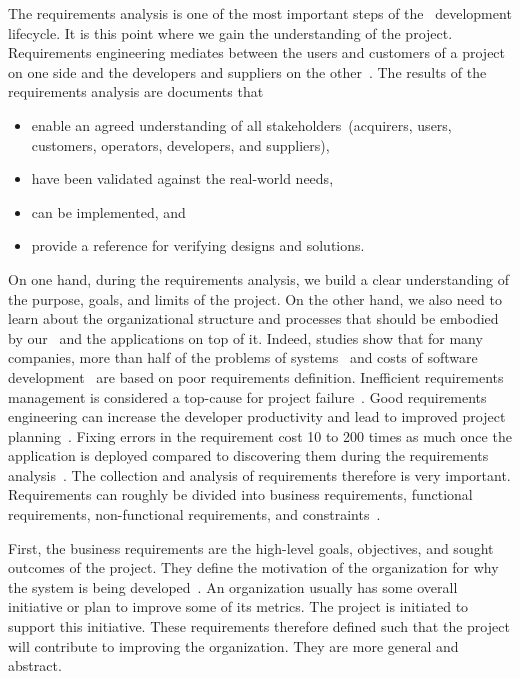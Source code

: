 %
%
The requirements analysis is one of the most important steps of the \db\ development lifecycle.
It is this point where we gain the understanding of the project.
Requirements engineering mediates between the users and customers of a project on one side and the developers and suppliers on the other~\cite{ISOIECIEEE2018SASELCPRE}.
The results of the requirements analysis are  documents that~\cite{ISOIECIEEE2018SASELCPRE}%
\begin{itemize}[noitemsep]%
\item enable an agreed understanding of all stakeholders~(acquirers, users, customers, operators, developers, and suppliers),%
\item have been validated against the real-world needs,%
\item can be implemented, and%
\item provide a reference for verifying designs and solutions.%
\end{itemize}%
%
On one hand, during the requirements analysis, we build a clear understanding of the purpose, goals, and limits of the project.
On the other hand, we also need to learn about the organizational structure and processes that should be embodied by our \db\ and the applications on top of it.
Indeed, studies show that for many companies, more than half of the problems of systems~\cite{S2003ISA6P:RDARS} and costs of software development~\cite{IC2009BAB2TPTS} are based on poor requirements definition.
Inefficient requirements management is considered a top-cause for project failure~\cite{EDN2005RUIFACI}.
Good requirements engineering can increase the developer productivity and lead to improved project planning~\cite{DCVP2005READSDFFAC}.
Fixing errors in the requirement cost 10 to 200 times as much once the application is deployed compared to discovering them during the requirements analysis~\cite{BP1988UACSC,M2001FTEAOOP,RGJ2023EASARBFSAR}.
The collection and analysis of requirements therefore is very important.%
%
Requirements can roughly be divided into business requirements, functional requirements, non-functional requirements, and constraints~\cite{I2018SAH}.

First, the business requirements are the high-level goals, objectives, and sought outcomes of the project.
They define the motivation of the organization for why the system is being developed~\cite{ISOIECIEEE2018SASELCPRE}.
An organization usually has some overall initiative or plan to improve some of its metrics.
The project is initiated to support this initiative.
These requirements therefore defined such that the project will contribute to improving the organization.
They are more general and abstract.

